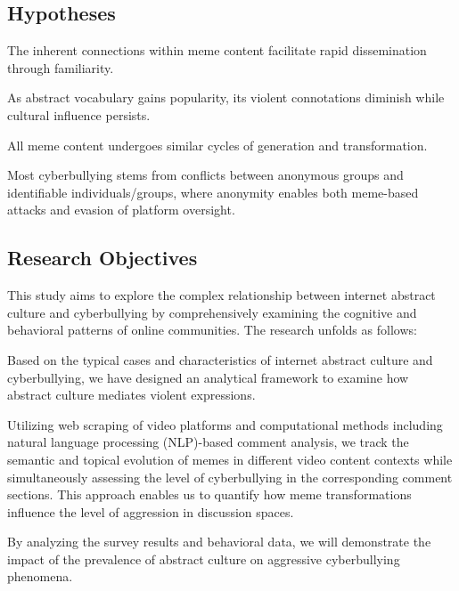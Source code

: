 \documentclass[12pt,a4paper]{ctexart}
\theoremstyle{MyLineTheoremStyle}
\theoremstyle{MyBlockTheoremStyle}
\theoremstyle{MySubsubsectionStyle}
\begin{document}
\subsection{Hypotheses}

The inherent connections within meme content facilitate rapid dissemination through familiarity.

As abstract vocabulary gains popularity, its violent connotations diminish while cultural influence persists.

All meme content undergoes similar cycles of generation and transformation.

Most cyberbullying stems from conflicts between anonymous groups and identifiable individuals/groups, where anonymity enables both meme-based attacks and evasion of platform oversight.

\subsection{Research Objectives}%

This study aims to explore the complex relationship between internet abstract culture and cyberbullying by comprehensively examining the cognitive and behavioral patterns of online communities. The research unfolds as follows:

Based on the typical cases and characteristics of internet abstract culture and cyberbullying, we have designed an analytical framework to examine how abstract culture mediates violent expressions.

Utilizing web scraping of video platforms and computational methods including natural language processing (NLP)-based comment analysis, we track the semantic and topical evolution of memes in different video content contexts while simultaneously assessing the level of cyberbullying in the corresponding comment sections. This approach enables us to quantify how meme transformations influence the level of aggression in discussion spaces.

By analyzing the survey results and behavioral data, we will demonstrate the impact of the prevalence of abstract culture on aggressive cyberbullying phenomena.
\end{document}
